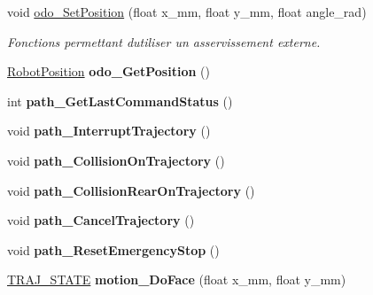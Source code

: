 \begin{DoxyCompactItemize}
\mbox{\label{classAsservDriver_a5806e26618e1b2a4590b67ba55a55165}} 
void \hyperlink{classAsservDriver_a5806e26618e1b2a4590b67ba55a55165}{odo\+\_\+\+Set\+Position} (float x\+\_\+mm, float y\+\_\+mm, float angle\+\_\+rad)
\begin{DoxyCompactList}\small\item\em Fonctions permettant d\textquotesingle{}utiliser un asservissement externe. \end{DoxyCompactList}\item 
\mbox{\label{classAsservDriver_a0a62fbec28bfc5510eb75b6ad434baed}} 
\hyperlink{structRobotPosition}{Robot\+Position} {\bfseries odo\+\_\+\+Get\+Position} ()
\item 
\mbox{\label{classAsservDriver_ac4b8627777e76c145265a8e988852484}} 
int {\bfseries path\+\_\+\+Get\+Last\+Command\+Status} ()
\item 
\mbox{\label{classAsservDriver_affc4e315cdd03c826cea17114d02a19c}} 
void {\bfseries path\+\_\+\+Interrupt\+Trajectory} ()
\item 
\mbox{\label{classAsservDriver_a6af616f39706df060f1b81b2047c7a7f}} 
void {\bfseries path\+\_\+\+Collision\+On\+Trajectory} ()
\item 
\mbox{\label{classAsservDriver_a370b2f287b352211c07a023edcb63bc7}} 
void {\bfseries path\+\_\+\+Collision\+Rear\+On\+Trajectory} ()
\item 
\mbox{\label{classAsservDriver_a7f18af77a8524e09f8c9b024d4f0e4b8}} 
void {\bfseries path\+\_\+\+Cancel\+Trajectory} ()
\item 
\mbox{\label{classAsservDriver_aa54769b7bbe83fefa64925aa60089096}} 
void {\bfseries path\+\_\+\+Reset\+Emergency\+Stop} ()
\item 
\mbox{\label{classAsservDriver_af7b023caadc3314c7640c98378829636}} 
\hyperlink{path__manager_8h_adb3360abeb29758da93865c8afcb80eb}{T\+R\+A\+J\+\_\+\+S\+T\+A\+TE} {\bfseries motion\+\_\+\+Do\+Face} (float x\+\_\+mm, float y\+\_\+mm)
\item 

\end{DoxyCompactItemize}
